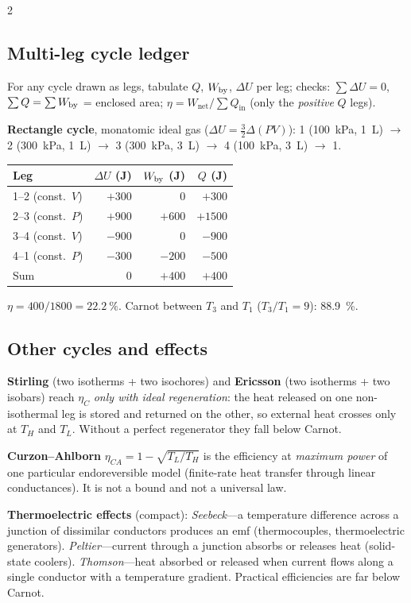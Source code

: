 \begin{multicols}{2}
\subsection{Multi-leg cycle ledger}\label{sec:cycleledger}
\CORE{} For any cycle drawn as legs, tabulate $Q$, $W_{\mathrm{by}}$, $\Delta U$ per leg; checks: $\sum\Delta U=0$, $\sum Q=\sum W_{\mathrm{by}}$ = enclosed area; $\eta=W_{\text{net}}/\sum Q_{\text{in}}$ (only the \emph{positive} $Q$ legs).

\begin{demobox}\textbf{Rectangle cycle}, monatomic ideal gas ($\Delta U=\tfrac32\Delta(PV)$): 1 (\SI{100}{kPa}, \SI{1}{L}) $\to$ 2 (\SI{300}{kPa}, \SI{1}{L}) $\to$ 3 (\SI{300}{kPa}, \SI{3}{L}) $\to$ 4 (\SI{100}{kPa}, \SI{3}{L}) $\to$ 1.
\begin{center}\small
\begin{tabular}{@{}lrrr@{}}
\toprule
Leg & $\Delta U$ (J) & $W_{\mathrm{by}}$ (J) & $Q$ (J)\\
\midrule
1--2 (const.\ $V$) & $+300$ & 0 & $+300$\\
2--3 (const.\ $P$) & $+900$ & $+600$ & $+1500$\\
3--4 (const.\ $V$) & $-900$ & 0 & $-900$\\
4--1 (const.\ $P$) & $-300$ & $-200$ & $-500$\\
\midrule
Sum & 0 & $+400$ & $+400$\\
\bottomrule
\end{tabular}
\end{center}
$\eta=400/1800=\SI{22.2}{\percent}$. Carnot between $T_3$ and $T_1$ ($T_3/T_1=9$): \SI{88.9}{\percent}.\end{demobox}

\subsection{Other cycles and effects}\label{sec:othercycles}
\textbf{Stirling} (two isotherms + two isochores) and \textbf{Ericsson} (two isotherms + two isobars) reach $\eta_C$ \emph{only with ideal regeneration}: the heat released on one non-isothermal leg is stored and returned on the other, so external heat crosses only at $T_H$ and $T_L$. Without a perfect regenerator they fall below Carnot.

\EXT{} \textbf{Curzon--Ahlborn} $\eta_{CA}=1-\sqrt{T_L/T_H}$ is the efficiency at \emph{maximum power} of one particular endoreversible model (finite-rate heat transfer through linear conductances). It is not a bound and not a universal law.

\textbf{Thermoelectric effects} (compact): \emph{Seebeck}---a temperature difference across a junction of dissimilar conductors produces an emf (thermocouples, thermoelectric generators). \emph{Peltier}---current through a junction absorbs or releases heat (solid-state coolers). \emph{Thomson}---heat absorbed or released when current flows along a single conductor with a temperature gradient. Practical efficiencies are far below Carnot.
\end{multicols}

